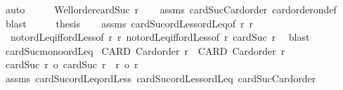\begin{isabellebody}
\ auto\isanewline
\ \ \isamarkupfalse%
\ \isamarkupfalse%
\ {\isachardoublequoteopen}Well{\isacharunderscore}{\kern0pt}order{\isacharparenleft}{\kern0pt}cardSuc\ r{\isacharparenright}{\kern0pt}{\isachardoublequoteclose}\isanewline
\ \ \isamarkupfalse%
\ assms\ cardSuc{\isacharunderscore}{\kern0pt}Card{\isacharunderscore}{\kern0pt}order\ card{\isacharunderscore}{\kern0pt}order{\isacharunderscore}{\kern0pt}on{\isacharunderscore}{\kern0pt}def\ \isamarkupfalse%
\ blast\isanewline
\ \ \isamarkupfalse%
\ \isamarkupfalse%
\ {\isacharquery}{\kern0pt}thesis\isanewline
\ \ \isamarkupfalse%
\ assms\ cardSuc{\isacharunderscore}{\kern0pt}ordLess{\isacharunderscore}{\kern0pt}ordLeq{\isacharbrackleft}{\kern0pt}of\ r\ r{\isacharprime}{\kern0pt}{\isacharbrackright}{\kern0pt}\isanewline
\ \ not{\isacharunderscore}{\kern0pt}ordLeq{\isacharunderscore}{\kern0pt}iff{\isacharunderscore}{\kern0pt}ordLess{\isacharbrackleft}{\kern0pt}of\ r\ r{\isacharprime}{\kern0pt}{\isacharbrackright}{\kern0pt}\ not{\isacharunderscore}{\kern0pt}ordLeq{\isacharunderscore}{\kern0pt}iff{\isacharunderscore}{\kern0pt}ordLess{\isacharbrackleft}{\kern0pt}of\ r{\isacharprime}{\kern0pt}\ {\isachardoublequoteopen}cardSuc\ r{\isachardoublequoteclose}{\isacharbrackright}{\kern0pt}\ \isamarkupfalse%
\ blast\isanewline
{}\isamarkupfalse%
%
\endisatagproof
{\isafoldproof}%
%
\isadelimproof
\isanewline
%
\endisadelimproof
\isanewline
{}\isamarkupfalse%
\ cardSuc{\isacharunderscore}{\kern0pt}mono{\isacharunderscore}{\kern0pt}ordLeq{\isacharcolon}{\kern0pt}\isanewline
{}\ CARD{\isacharcolon}{\kern0pt}\ {\isachardoublequoteopen}Card{\isacharunderscore}{\kern0pt}order\ r{\isachardoublequoteclose}\ \ CARD{\isacharprime}{\kern0pt}{\isacharcolon}{\kern0pt}\ {\isachardoublequoteopen}Card{\isacharunderscore}{\kern0pt}order\ r{\isacharprime}{\kern0pt}{\isachardoublequoteclose}\isanewline
{}\ {\isachardoublequoteopen}{\isacharparenleft}{\kern0pt}cardSuc\ r\ {\isasymle}o\ cardSuc\ r{\isacharprime}{\kern0pt}{\isacharparenright}{\kern0pt}\ {\isacharequal}{\kern0pt}\ {\isacharparenleft}{\kern0pt}r\ {\isasymle}o\ r{\isacharprime}{\kern0pt}{\isacharparenright}{\kern0pt}{\isachardoublequoteclose}\isanewline
%
\isadelimproof
%
\endisadelimproof
%
\isatagproof
{}\isamarkupfalse%
\ assms\ cardSuc{\isacharunderscore}{\kern0pt}ordLeq{\isacharunderscore}{\kern0pt}ordLess\ cardSuc{\isacharunderscore}{\kern0pt}ordLess{\isacharunderscore}{\kern0pt}ordLeq\ cardSuc{\isacharunderscore}{\kern0pt}Card{\isacharunderscore}{\kern0pt}order\ \isamarkupfalse%

\end{isabellebody}
